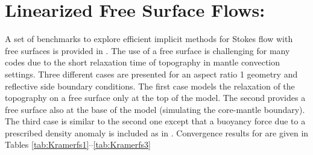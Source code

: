 %
%
%
%
%


\chapter{Linearized Free Surface Flows: \citeauthor{KramerPEPI2012}} \label{sec:kramer} 
A set of benchmarks to explore efficient implicit methods for Stokes flow  with
free surfaces is provided in \cite{KramerPEPI2012}. 
The use of a free surface is challenging for many codes due to the short relaxation
time of topography in mantle convection settings.
Three different cases are presented for an aspect ratio 1 geometry and reflective side
boundary conditions. The first case models the relaxation of the topography on a 
free surface only at the top of the model. The second provides a free surface also at the base of the model (simulating the core-mantle boundary). 
The third case is similar to the second one except that a buoyancy force due to a
prescribed density anomaly is included as in \citet{Zhong1996}.
Convergence results for are given in Tables \ref{tab:Kramerfs1}--\ref{tab:Kramerfs3}

